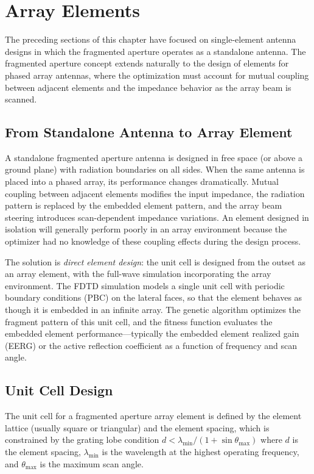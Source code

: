 \section{Array Elements}
\label{sec:ch4array}

The preceding sections of this chapter have focused on single-element antenna designs in which the fragmented aperture operates as a standalone antenna.  The fragmented aperture concept extends naturally to the design of elements for phased array antennas, where the optimization must account for mutual coupling between adjacent elements and the impedance behavior as the array beam is scanned.

\subsection{From Standalone Antenna to Array Element}

A standalone fragmented aperture antenna is designed in free space (or above a ground plane) with radiation boundaries on all sides.  When the same antenna is placed into a phased array, its performance changes dramatically.  Mutual coupling between adjacent elements modifies the input impedance, the radiation pattern is replaced by the embedded element pattern, and the array beam steering introduces scan-dependent impedance variations.  An element designed in isolation will generally perform poorly in an array environment because the optimizer had no knowledge of these coupling effects during the design process.

The solution is \emph{direct element design}: the unit cell is designed from the outset as an array element, with the full-wave simulation incorporating the array environment.  The FDTD simulation models a single unit cell with periodic boundary conditions (PBC) on the lateral faces, so that the element behaves as though it is embedded in an infinite array.  The genetic algorithm optimizes the fragment pattern of this unit cell, and the fitness function evaluates the embedded element performance---typically the embedded element realized gain (EERG) or the active reflection coefficient as a function of frequency and scan angle.

\subsection{Unit Cell Design}

The unit cell for a fragmented aperture array element is defined by the element lattice (usually square or triangular) and the element spacing, which is constrained by the grating lobe condition $d < \lambda_{\min}/(1 + \sin\theta_{\max})$ where $d$ is the element spacing, $\lambda_{\min}$ is the wavelength at the highest operating frequency, and $\theta_{\max}$ is the maximum scan angle.

